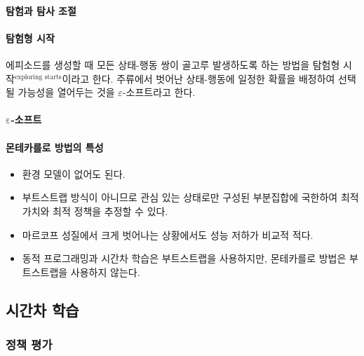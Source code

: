 \documentclass [12pt] {oblivoir}
\let\oldsubsubsection=\subsubsection
\renewcommand{\subsubsection}
{
  \filbreak
  \oldsubsubsection
}
\begin{document}
\paragraph*{탐험과 탐사 조절}\mbox{}

\vspace{3mm}

\paragraph*{탐험형 시작}\mbox{}

에피소드를 생성할 때 모든 상태-행동 쌍이 골고루 발생하도록 하는 방법을 탐험형 시작$^{\text{exploring starts}}$이라고 한다.
주류에서 벗어난 상태-행동에 일정한 확률을 배정하여 선택될 가능성을 열어두는 것을 $\varepsilon$-소프트라고 한다.

\vspace{3mm}

\paragraph*{$\mathbf{\mathrm{\varepsilon}}$-소프트}\mbox{}

\vspace{3mm}

\paragraph*{몬테카를로 방법의 특성}\mbox{}
\begin{itemize}
  \item 환경 모델이 없어도 된다.
  \item 부트스트랩 방식이 아니므로 관심 있는 상태로만 구성된 부분집합에 국한하여 최적 가치와 최적 정책을 추정할 수 있다.
  \item 마르코프 성질에서 크게 벗어나는 상황에서도 성능 저하가 비교적 적다.
  \item 동적 프로그래밍과 시간차 학습은 부트스트랩을 사용하지만, 몬테카를로 방법은 부트스트랩을 사용하지 않는다.
\end{itemize}

\vspace{3mm}

\subsection{시간차 학습}

\subsubsection{정책 평가}
\end{document}

